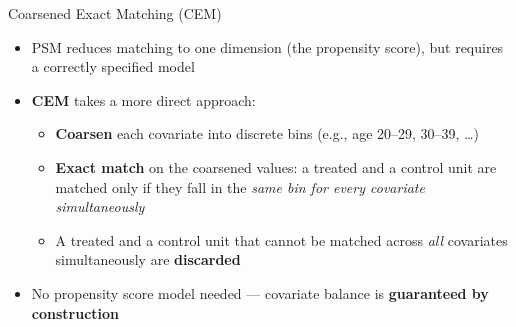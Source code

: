 \documentclass[dvipsnames,hyperref={pdfpagelabels=false}]{beamer}
\begin{document}
\begin{frame}{Coarsened Exact Matching (CEM)}
\begin{itemize}
    \item PSM reduces matching to one dimension (the propensity score),
    but requires a correctly specified model
    \vspace{0.2cm}
    \item \textbf{CEM} takes a more direct approach:
    \vspace{0.2cm}
    \begin{itemize}
        \item \textbf{Coarsen} each covariate into discrete bins
        (e.g., age 20--29, 30--39, \ldots)
        \vspace{0.2cm}
        \item \textbf{Exact match} on the coarsened values: a treated
        and a control unit are matched only if they fall in the
        \emph{same bin for every covariate simultaneously}
        \vspace{0.2cm}
        \item A treated and a control unit that cannot be matched
        across \emph{all} covariates simultaneously are
        \textbf{discarded}
    \end{itemize}
    \vspace{0.2cm}
    \item No propensity score model needed --- covariate balance is
    \textbf{guaranteed by construction}
\end{itemize}
\end{frame}
\end{document}
